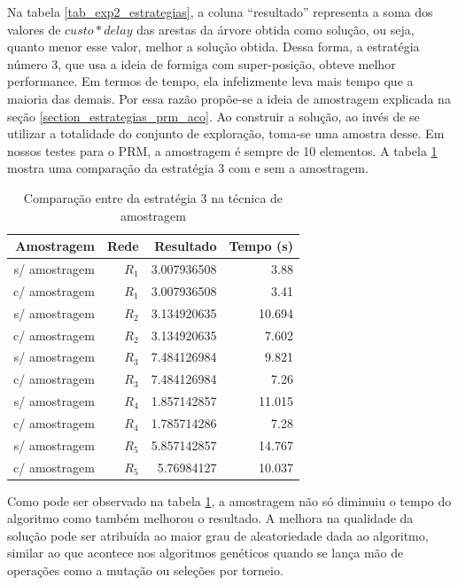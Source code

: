 Na tabela \ref{tab_exp2_estrategias}, a coluna ``resultado'' representa a soma dos valores de $custo * delay$ das arestas da árvore obtida como solução, ou seja, quanto menor esse valor, melhor a solução obtida. Dessa forma, a estratégia número 3, que usa a ideia de formiga com super-posição, obteve melhor performance. Em termos de tempo, ela infelizmente leva mais tempo que a maioria das demais. Por essa razão propõe-se a ideia de amostragem explicada na seção \ref{section_estrategias_prm_aco}. Ao construir a solução, ao invés de se utilizar a totalidade do conjunto de exploração, toma-se uma amostra desse. Em nossos testes para o PRM, a amostragem é sempre de 10 elementos. A tabela \ref{tab_exp2_amostragem} mostra uma comparação da estratégia 3 com e sem a amostragem.

\begin{table}[!htbp]
	\centering
	\caption{Comparação entre da estratégia 3 na técnica de amostragem}
	\label{tab_exp2_amostragem}
	\begin{tabular}{rrrr}
		Amostragem    & Rede & Resultado   & Tempo (s) \\ \hline
		s/ amostragem & $R_1$    & 3.007936508 & 3.88      \\
		\rowcolor{table-green}
		c/ amostragem & $R_1$    & 3.007936508 & 3.41      \\ \hline
		s/ amostragem & $R_2$    & 3.134920635 & 10.694    \\
		\rowcolor{table-green}
		c/ amostragem & $R_2$    & 3.134920635 & 7.602     \\ \hline
		s/ amostragem & $R_3$    & 7.484126984 & 9.821     \\
		\rowcolor{table-green}
		c/ amostragem & $R_3$    & 7.484126984 & 7.26      \\ \hline
		s/ amostragem & $R_4$    & 1.857142857 & 11.015    \\
		\rowcolor{table-green}
		c/ amostragem & $R_4$    & 1.785714286 & 7.28      \\ \hline
		s/ amostragem & $R_5$    & 5.857142857 & 14.767    \\
		\rowcolor{table-green}
		c/ amostragem & $R_5$    & 5.76984127  & 10.037    \\ \hline
	\end{tabular}
\end{table}

Como pode ser observado na tabela \ref{tab_exp2_amostragem}, a amostragem não só diminuiu o tempo do algoritmo como também melhorou o resultado. A melhora na qualidade da solução pode ser atribuída ao maior grau de aleatoriedade dada ao algoritmo, similar ao que acontece nos algoritmos genéticos quando se lança mão de operações como a mutação ou seleções por torneio.

